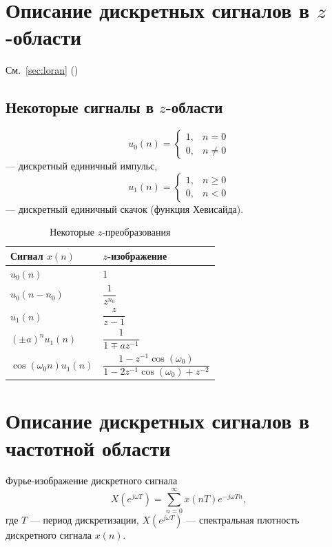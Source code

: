 \documentclass[a4paper, 14pt]{extarticle}
\begin{document}
\section{Описание дискретных сигналов в $z$-области}
См.~\ref{sec:loran} ()

\subsection{Некоторые сигналы в $z$-области}
\begin{equation}
    u_0(n) = \begin{cases}
        1, &n=0\\
        0, &n\ne 0
    \end{cases}
\end{equation}
--- дискретный единичный импульс,
\begin{equation}
    u_1(n) = \begin{cases}
        1, &n \ge 0\\
        0, &n < 0
    \end{cases}
\end{equation}
--- дискретный единичный скачок (функция Хевисайда).
\begin{table}[h]
    \centering
    \caption{Некоторые $z$-преобразования}
    \begin{tabular}{@{}ll@{}}
        \toprule
        \textbf{Сигнал $x(n)$} & $z$-изображение \\ \midrule
        $u_0(n)$ & 1 \\[6pt]
        $u_0(n-n_0)$ & $ \dfrac{1}{z^{n_0}} $ \\[12pt]
        $u_1(n)$ & $ \dfrac{z}{z-1} $ \\[12pt]
        ${(\pm a)}^n u_1(n)$ & $ \dfrac{1}{1 \mp az^{-1}} $ \\[12pt]
        $\cos( \omega_0 n ) u_1(n)$ & $ \dfrac{1 - z^{-1} \cos( \omega_0 )}{1 - 2z^{-1} \cos( \omega_0 ) + z^{-2}} $ \\ \bottomrule
    \end{tabular}
\end{table}

\section{Описание дискретных сигналов в частотной области}
Фурье-изображение дискретного сигнала
\begin{equation}
    X(e^{j \omega T}) = \sum^{\infty}_{n=0} x(nT)e^{-j \omega Tn},
\end{equation}
где $T$ --- период дискретизации, $X(e^{j \omega T})$ --- спектральная плотность дискретного сигнала $x(n)$.
\end{document}
